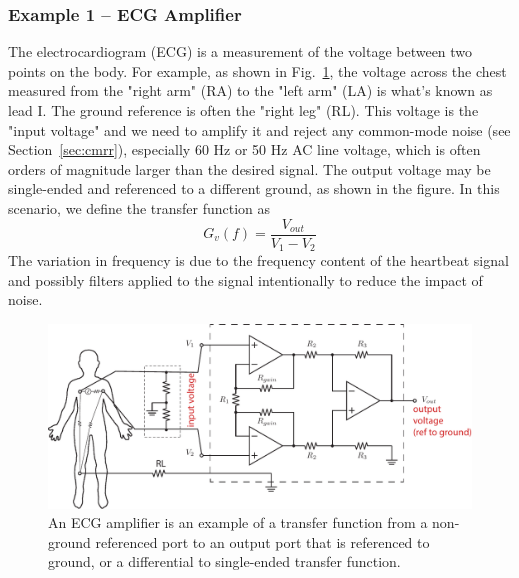 \subsubsection{Example 1 – ECG Amplifier}
The electrocardiogram (ECG) is a measurement of the voltage between two points on the body.  For example, as shown in Fig.~\ref{fig:ecg}, the voltage across the chest measured from the "right arm" (RA) to the "left arm" (LA) is what's known as lead I.  The ground reference is often the "right leg" (RL).  This voltage is the "input voltage" and we need to amplify it and reject any common-mode noise (see Section~\ref{sec:cmrr}), especially 60 Hz or 50 Hz AC line voltage, which is often orders of magnitude larger than the desired signal.  The output voltage may be single-ended and referenced to a different ground, as shown in the figure. 
In this scenario, we define the transfer function as
    \begin{equation}
        G_v(f) = \frac{V_{out}}{V_1 - V_2 }
    \end{equation}
The variation in frequency is due to the frequency content of the heartbeat signal and possibly filters applied to the signal intentionally to reduce the impact of noise.
\begin{figure}[tb]
\begin{center}
\includegraphics[width=.95\columnwidth]{ex_opamp-ia2}
\end{center}
\caption{An ECG amplifier is an example of a transfer function from a non-ground referenced port to an output port that is referenced to ground, or a differential to single-ended transfer function.} \label{fig:ecg}
\end{figure}
